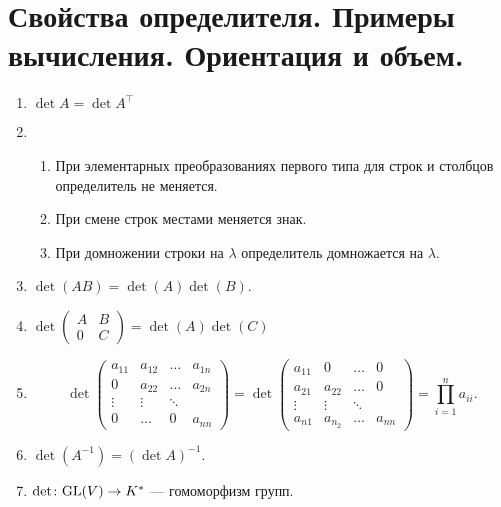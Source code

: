 % 
% 
\section{Свойства определителя. Примеры вычисления. Ориентация и объем.}
\begin{lm}
    \begin{enumerate}[noitemsep]
        \item $ \det A = \det A^{\top}$
	\item 
	    \begin{enumerate}[noitemsep]
		\item При элементарных преобразованиях первого типа для строк и столбцов определитель не меняется.
		\item При смене строк местами меняется знак.
		\item При домножении строки на $ \lambda $ определитель домножается на $ \lambda $.
	    \end{enumerate} 
	\item $ \det(AB) = \det(A)\det(B)$.
	\item $ \det 
	    \begin{pmatrix}
		A&B\\0&C
	    \end{pmatrix} = \det (A) \det (C)$
	\item 
	    \[
	    \det 
	    \begin{pmatrix}
		a_{11} & a_{12} & \ldots & a_{1n}\\
		0 & a_{22} & \ldots & a_{2n}\\
		\vdots & \vdots & \ddots & \\
		0 & \ldots & 0&  a_{nn}
	    \end{pmatrix}
	    =
	    \det 
	    \begin{pmatrix}
		a_{11} & 0 & \ldots & 0\\
		a_{21} & a_{22} & \ldots & 0\\
		\vdots & \vdots & \ddots & \\
		a_{n1} & a_{n_2} &  \ldots &  a_{nn}
	    \end{pmatrix}
	    = \prod_{i = 1}^{n} a_{ii}
	    .\] 
	\item $ \det (A^{-1}) = (\det A)^{-1}$.
	\item $ \det \colon {\mathop{\text{\rm GL}}}(V) \to  K^{*}$ --- гомоморфизм групп.
    \end{enumerate} 
\end{lm}
